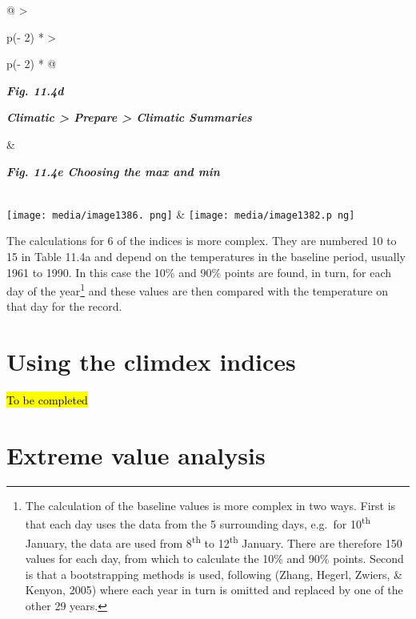 \documentclass[
  letterpaper,
  DIV=11,
  numbers=noendperiod]{scrreprt}
\begin{document}
\begin{longtable}[]{@{}
  >{\raggedright\arraybackslash}p{(\columnwidth - 2\tabcolsep) * }
  >{\raggedright\arraybackslash}p{(\columnwidth - 2\tabcolsep) * }@{}}
\toprule\noalign{}
\begin{minipage}[b]{\linewidth}\raggedright
\textbf{\emph{Fig. 11.4d}}

\textbf{\emph{Climatic \textgreater{} Prepare \textgreater{} Climatic
Summaries}}
\end{minipage} & \begin{minipage}[b]{\linewidth}\raggedright
\textbf{\emph{Fig. 11.4e Choosing the max and min}}
\end{minipage} \\
\midrule\noalign{}
\endhead
\bottomrule\noalign{}
\endlastfoot
\texttt{[image: media/image1386. png]}
&
\texttt{[image: media/image1382.p ng]} \\
\end{longtable}

The calculations for 6 of the indices is more complex. They are numbered
10 to 15 in Table 11.4a and depend on the temperatures in the baseline
period, usually 1961 to 1990. In this case the 10\% and 90\% points are
found, in turn, for each day of the year\footnote{The calculation of the
  baseline values is more complex in two ways. First is that each day
  uses the data from the 5 surrounding days, e.g.~for
  10\textsuperscript{th} January, the data are used from
  8\textsuperscript{th} to 12\textsuperscript{th} January. There are
  therefore 150 values for each day, from which to calculate the 10\%
  and 90\% points. Second is that a bootstrapping methods is used,
  following (Zhang, Hegerl, Zwiers, \& Kenyon, 2005) where each year in
  turn is omitted and replaced by one of the other 29 years.} and these
values are then compared with the temperature on that day for the
record.

\section{Using the climdex indices}\label{using-the-climdex-indices}

\hl{To be completed}

\section{Extreme value analysis}\label{extreme-value-analysis}
\end{document}
